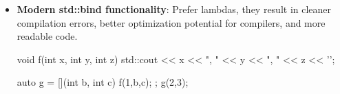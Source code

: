 \documentclass{report}
\begin{document}
\begin{itemize}
\begin{cppcode}
{                    auto goodIncrement = std::bind(increment, std::ref(x)); // Passes reference
                    goodIncrement(); // 'x' is now 1
                }
            \end{cppcode}
        \item \textbf{Modern std::bind functionality}: Prefer lambdas, they result in cleaner compilation errors, better optimization potential for compilers, and more readable code.
            \bigbreak \noindent 
            \begin{cppcode}
                void f(int x, int y, int z) {
                    std::cout << x << ", " << y << ", " << z << '\n';
                }

                auto g = [](int b, int c) { f(1,b,c); };
                g(2,3);
            \end{cppcode}



    \end{itemize}
\end{document}
